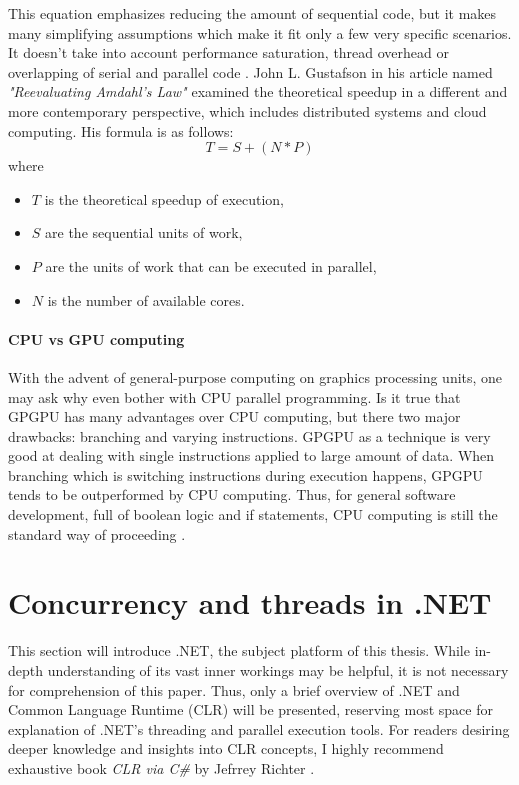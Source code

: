 This equation emphasizes reducing the amount of sequential code, but it makes many simplifying assumptions which make it fit only a few very specific scenarios. It doesn't take into account performance saturation, thread overhead or overlapping of serial and parallel code \cite{Popov2010}.
John L. Gustafson in his article named \emph{"Reevaluating Amdahl's Law"} \cite{Gustafson1988} examined the theoretical speedup in a different and more contemporary perspective, which includes distributed systems and cloud computing. His formula is as follows: 
\begin{equation}
T = S + (N*P)
\end{equation}
where
\begin{itemize}
	\item $T$ is the theoretical speedup of execution,
	\item $S$ are the sequential units of work,
	\item $P$ are the units of work that can be executed in parallel,
	\item $N$ is the number of available cores.
\end{itemize}

\paragraph{CPU vs GPU computing\newline}
With the advent of general-purpose computing on graphics processing units, one may ask why even bother with CPU parallel programming. Is it true that GPGPU has many advantages over CPU computing, but there two major drawbacks: branching and varying instructions. GPGPU as a technique is very good at dealing with single instructions applied to large amount of data. When branching which is switching instructions during execution happens, GPGPU tends to be outperformed by CPU computing. Thus, for general software development, full of boolean logic and if statements, CPU computing is still the standard way of proceeding \cite{Tarditi2006}.

\section{Concurrency and threads in .NET}
This section will introduce .NET, the subject platform of this thesis. While in-depth understanding of its vast inner workings may be helpful, it is not necessary for comprehension of this paper. Thus, only a brief overview of .NET and Common Language Runtime (CLR) will be presented, reserving most space for explanation of .NET's threading and parallel execution tools. For readers desiring deeper knowledge and insights into CLR concepts, I highly recommend exhaustive book \emph{CLR via C\#} by Jefrrey Richter \cite{Richter2012}.

